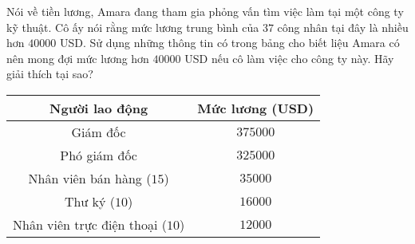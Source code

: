 \begin{bt}%
Nói về tiền lương, Amara đang tham gia phỏng vấn tìm việc làm tại một công ty kỹ thuật. Cô ấy nói rằng mức lương trung bình của $37$ công nhân tại đây là nhiều hơn $40000$ USD. Sử dụng những thông tin có trong bảng cho biết liệu Amara có nên mong đợi mức lương hơn $40000$ USD nếu cô làm việc cho công ty này. Hãy giải thích tại sao?
\begin{center}
\renewcommand{\arraystretch}{1.25}
\begin{tabular}{|c|c|}
\hline
\textbf{Người lao động}&\textbf{Mức lương (USD)}\\ 
\hline
Giám đốc&$375000$\\ 
\hline
Phó giám đốc&$325000$\\ 
\hline
Nhân viên bán hàng ($15$)&$35000$\\ 
\hline
Thư ký ($10$)&$16000$\\ 
\hline
Nhân viên trực điện thoại ($10$)&$12000$\\ 
\hline
\end{tabular}
\end{center}
\end{bt}
